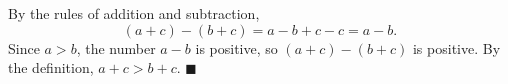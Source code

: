 By the rules of addition and subtraction,
\[(a+c)-(b+c)=a-b+c-c=a-b.\]
Since $a>b$, the number $a-b$ is positive, so $(a+c)-(b+c)$ is positive. By the definition, $a+c>b+c$. $\blacksquare$
